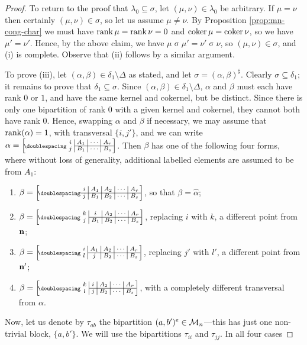 \begin{lemma}
\begin{proof}
    To return to the proof that $\lambda_0 \subseteq \sigma$, let
    $(\mu, \nu) \in \lambda_0$ be arbitrary.  If $\mu = \nu$ then certainly
    $(\mu, \nu) \in \sigma$, so let us assume $\mu \neq \nu$.  By Proposition
    \ref{prop:mn-cong-char} we must have $\operatorname{rank}\mu = \operatorname{rank}\nu = 0$ and
    $\operatorname{coker}\mu = \operatorname{coker}\nu$, so we have $\mu' = \nu'$.  Hence, by the above
    claim, we have $\mu \mathrel\sigma \mu' = \nu' \mathrel\sigma \nu$,
    so $(\mu, \nu) \in \sigma$, and (i) is complete.  Observe that (ii) follows
    by a similar argument.

    To prove (iii), let $(\alpha,\beta)\in\delta_1\setminus\Delta$ as stated,
    and let $\sigma = (\alpha,\beta)^\sharp$.  Clearly
    $\sigma \subseteq \delta_1$; it remains to prove that
    $\delta_1 \subseteq \sigma$.  Since
    $(\alpha,\beta) \in \delta_1 \setminus \Delta$, $\alpha$ and $\beta$ must
    each have rank $0$ or $1$, and have the same kernel and
    cokernel, but be distinct.  Since there is only one bipartition of rank $0$
    with a given kernel and cokernel, they cannot both have rank $0$.  Hence,
    swapping $\alpha$ and $\beta$ if necessary, we may assume that
    $\operatorname{rank}(\alpha)=1$, with transversal $\{i,j'\}$, and we can write
    $\alpha=\bipart{c|c|c|c}{2-4}
    {i & A_1 & \cdots & A_r}{j & B_1 & \cdots & B_s}$.
    Then $\beta$ has one of the following four forms, where without loss of
    generality, additional labelled elements are assumed to be from $A_1$:
    \begin{enumerate}[\rm(a)]
    \item $\beta = \bipart{c|c|c|c|c}{1-5}
      {i & A_1 & A_2 & \cdots & A_r}{j & B_1 & B_2 & \cdots & B_s}$,
      so that $\beta = \widehat\alpha$;
    \item $\beta = \bipart{c|c|c|c|c}{2-5}
      {k & i & A_2 & \cdots & A_r}{j & B_1 & B_2 & \cdots & B_s}$,
      replacing $i$ with $k$, a different point from $\mathbf{n}$;
    \item $\beta = \bipart{c|c|c|c|c}{2-5}
      {i & A_1 & A_2 & \cdots & A_r}{l & j & B_2 & \cdots & B_s}$,
      replacing $j'$ with $l'$, a different point from $\mathbf{n}'$;
    \item $\beta = \bipart{c|c|c|c|c}{2-5}
      {k & i & A_2 & \cdots & A_r}{l & j & B_2 & \cdots & B_s}$,
      with a completely different transversal from $\alpha$.
    \end{enumerate}
    Now, let us denote by $\tau_{ab}$ the bipartition
    $(a, b')^e \in \mathcal{M}_n$---this has just one non-trivial block, $\{a,b'\}$.
    We will use the bipartitions $\tau_{ii}$ and $\tau_{jj}$. In all four cases

\end{proof}
\end{lemma}
